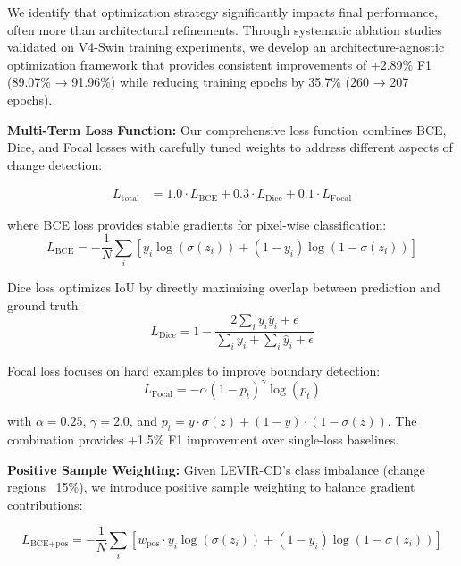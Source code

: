 \documentclass[journal]{IEEEtran}
\begin{document}
We identify that optimization strategy significantly impacts final performance, often more than architectural refinements. Through systematic ablation studies validated on V4-Swin training experiments, we develop an architecture-agnostic optimization framework that provides consistent improvements of +2.89\% F1 (89.07\% → 91.96\%) while reducing training epochs by 35.7\% (260 → 207 epochs).

\textbf{Multi-Term Loss Function:} Our comprehensive loss function combines BCE, Dice, and Focal losses with carefully tuned weights to address different aspects of change detection:

\begin{equation}
\begin{aligned}
L_{\text{total}} &= 1.0 \cdot L_{\text{BCE}} + 0.3 \cdot L_{\text{Dice}} + 0.1 \cdot L_{\text{Focal}}
\end{aligned}
\label{eq:loss_total}
\end{equation}

where BCE loss provides stable gradients for pixel-wise classification:
\begin{equation}
L_{\text{BCE}} = -\frac{1}{N} \sum_i [y_i \log(\sigma(z_i)) + (1-y_i) \log(1-\sigma(z_i))]
\label{eq:bce}
\end{equation}

Dice loss optimizes IoU by directly maximizing overlap between prediction and ground truth:
\begin{equation}
L_{\text{Dice}} = 1 - \frac{2 \sum_i y_i \hat{y}_i + \epsilon}{\sum_i y_i + \sum_i \hat{y}_i + \epsilon}
\label{eq:dice}
\end{equation}

Focal loss focuses on hard examples to improve boundary detection:
\begin{equation}
L_{\text{Focal}} = -\alpha (1-p_t)^\gamma \log(p_t)
\label{eq:focal}
\end{equation}

with $\alpha=0.25$, $\gamma=2.0$, and $p_t = y \cdot \sigma(z) + (1-y) \cdot (1-\sigma(z))$. The combination provides +1.5\% F1 improvement over single-loss baselines.

\textbf{Positive Sample Weighting:} Given LEVIR-CD's class imbalance (change regions ~15\%), we introduce positive sample weighting to balance gradient contributions:

\begin{equation}
L_{\text{BCE+pos}} = -\frac{1}{N} \sum_i [w_{\text{pos}} \cdot y_i \log(\sigma(z_i)) + (1-y_i) \log(1-\sigma(z_i))]
\label{eq:bce_pos}
\end{equation}
\end{document}
